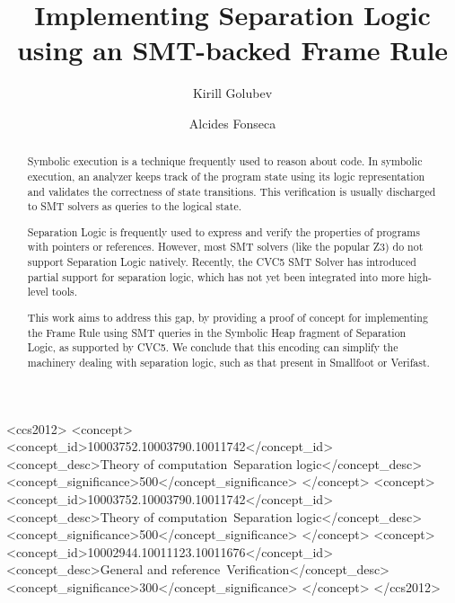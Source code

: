 \documentclass[sigplan,screen,review]{acmart}
\begin{document}
\title[Implementing Separation Logic using an SMT-backed Frame Rule]{Implementing Separation Logic \\ using an SMT-backed Frame Rule}

\author{Kirill Golubev}

\author{Alcides Fonseca}

\begin{abstract}

Symbolic execution is a technique frequently used to reason about code. In symbolic execution, an analyzer keeps track of the program state using its logic representation and validates the correctness of state transitions. This verification is usually discharged to SMT solvers as queries to the logical state.

Separation Logic is frequently used to express and verify the properties of programs with pointers or references. However, most SMT solvers (like the popular Z3) do not support Separation Logic natively. Recently, the CVC5 SMT Solver has introduced partial support for separation logic, which has not yet been integrated into more high-level tools.

This work aims to address this gap, by providing a proof of concept for implementing the Frame Rule using SMT queries in the Symbolic Heap fragment of Separation Logic, as supported by CVC5. We conclude that this encoding can simplify the machinery dealing with separation logic, such as that present in Smallfoot or Verifast.

\end{abstract}

\begin{CCSXML}
<ccs2012>
<concept>
<concept_id>10003752.10003790.10011742</concept_id>
<concept_desc>Theory of computation~Separation logic</concept_desc>
<concept_significance>500</concept_significance>
</concept>
<concept>
<concept_id>10003752.10003790.10011742</concept_id>
<concept_desc>Theory of computation~Separation logic</concept_desc>
<concept_significance>500</concept_significance>
</concept>
<concept>
<concept_id>10002944.10011123.10011676</concept_id>
<concept_desc>General and reference~Verification</concept_desc>
<concept_significance>300</concept_significance>
</concept>
</ccs2012>
\end{CCSXML}
\end{document}
